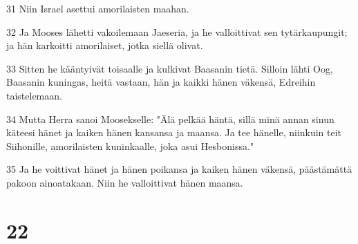 \par 31 Niin Israel asettui amorilaisten maahan.
\par 32 Ja Mooses lähetti vakoilemaan Jaeseria, ja he valloittivat sen tytärkaupungit; ja hän karkoitti amorilaiset, jotka siellä olivat.
\par 33 Sitten he kääntyivät toisaalle ja kulkivat Baasanin tietä. Silloin lähti Oog, Baasanin kuningas, heitä vastaan, hän ja kaikki hänen väkensä, Edreihin taistelemaan.
\par 34 Mutta Herra sanoi Moosekselle: "Älä pelkää häntä, sillä minä annan sinun käteesi hänet ja kaiken hänen kansansa ja maansa. Ja tee hänelle, niinkuin teit Siihonille, amorilaisten kuninkaalle, joka asui Hesbonissa."
\par 35 Ja he voittivat hänet ja hänen poikansa ja kaiken hänen väkensä, päästämättä pakoon ainoatakaan. Niin he valloittivat hänen maansa.

\chapter{22}

